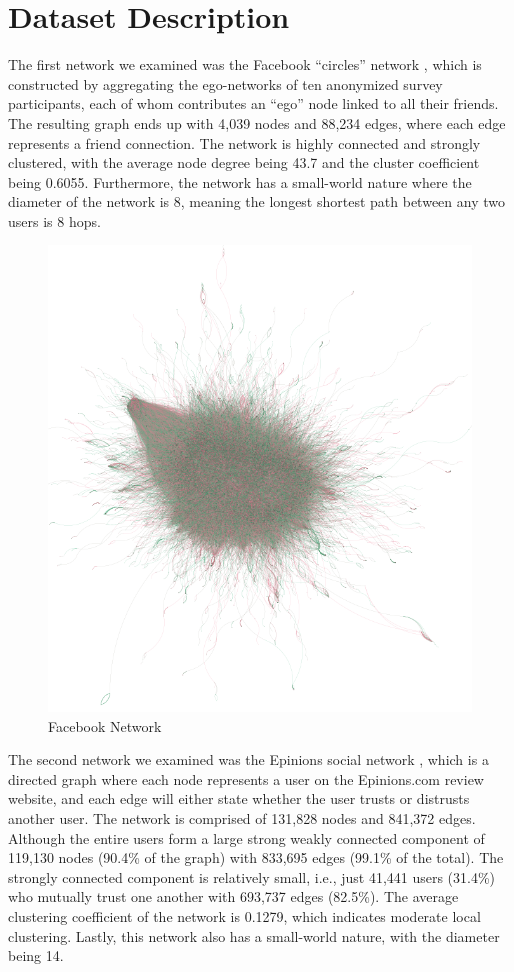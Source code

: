 \section{Dataset Description}

The first network we examined was the Facebook “circles” network \cite{LeskovecHuttenlocherKleinberg2010}, which is constructed by aggregating the ego-networks of ten anonymized survey participants, each of whom contributes an “ego” node linked to all their friends. The resulting graph ends up with 4,039 nodes and 88,234 edges, where each edge represents a friend connection. The network is highly connected and strongly clustered, with the average node degree being 43.7 and the cluster coefficient being 0.6055. Furthermore, the network has a small-world nature where the diameter of the network is 8, meaning the longest shortest path between any two users is 8 hops. 

\begin{figure}[ht]
    \centering
    \includegraphics[width=0.8\linewidth]{figures/init_fb.png}
    \caption{Facebook Network}
    \label{fig:init_fb}
\end{figure}

The second network we examined was the Epinions social network \cite{McAuleyLeskovec2012}, which is a directed graph where each node represents a user on the Epinions.com review website, and each edge will either state whether the user trusts or distrusts another user. The network is comprised of 131,828 nodes and 841,372 edges. Although the entire users form a large strong weakly connected component of 119,130 nodes (90.4\% of the graph) with 833,695 edges (99.1\% of the total). The strongly connected component is relatively small, i.e., just 41,441 users (31.4\%) who mutually trust one another with 693,737 edges (82.5\%). The average clustering coefficient of the network is 0.1279, which indicates moderate local clustering. Lastly, this network also has a small-world nature, with the diameter being 14. 

